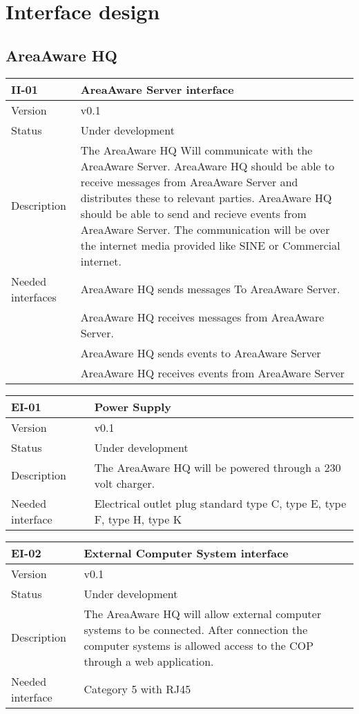 \chapter{Interface design}
\label{chp_interfaceDesign}

\section{AreaAware HQ}
\label{sec:areaAwarehq}

\begin{longtable}{| p{3.5cm} |  p{10cm} | }
	\hline
	\textbf{II-01} &  \textbf{AreaAware Server interface } \\
	\hline
	Version & v0.1 \\
	\hline
	Status & Under development \\
	\hline
	 Description & The AreaAware HQ Will communicate with the AreaAware Server. AreaAware HQ should be able to receive messages from AreaAware Server and distributes these to relevant parties. AreaAware HQ should be able to send and recieve events from AreaAware Server. The communication will be over the internet media provided like SINE or Commercial internet. 
	  \\
	\hline
	 Needed interfaces & AreaAware HQ sends messages To AreaAware Server.  \\
				& AreaAware HQ receives messages from AreaAware Server. \\
				& AreaAware HQ sends events to AreaAware Server  \\
				& AreaAware HQ receives events from AreaAware Server  \\
	\hline
\end{longtable}

\begin{longtable}{| p{3.5cm} |  p{10cm} | }
	\hline
	\textbf{EI-01} &  \textbf{Power Supply} \\
	\hline
	Version & v0.1 \\
	\hline
	Status & Under development \\
	\hline
	Description & The AreaAware HQ will be powered through a 230 volt charger.	\\
	\hline
	Needed interface &  Electrical outlet plug standard type C, type E,  type F,  type H, type K \\
	\hline
\end{longtable}

\begin{longtable}{| p{3.5cm} |  p{10cm} | }
	\hline
	\textbf{EI-02} &  \textbf{External Computer System interface} \\
	\hline
	Version & v0.1 \\
	\hline
	Status & Under development \\
	\hline
	Description & The AreaAware HQ will allow external computer systems to be connected. After connection the computer systems is allowed access to the COP through a web application.	\\
	\hline
	Needed interface & Category 5 with RJ45 \\
	\hline
\end{longtable}

